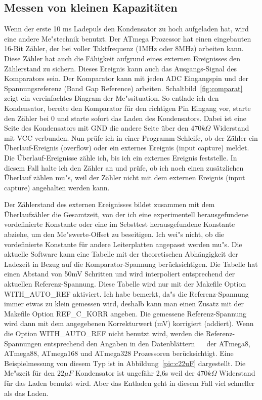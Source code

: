 \subsection{Messen von kleinen Kapazit\"aten}
Wenn der erste 10 ms Ladepuls den Kondensator zu hoch aufgeladen hat, wird eine andere Me"stechnik benutzt.
Der ATmega Prozessor hat einen eingebauten 16-Bit Z\"ahler, der bei voller Taktfrequenz (1MHz oder 8MHz) arbeiten kann.
Diese Z\"ahler hat auch die F\"ahigkeit aufgrund eines externen Ereignisses den Z\"ahlerstand zu sichern.
Dieses Ereignis kann auch das Ausgangs-Signal des Komparators sein.
Der Komparator kann mit jeden ADC Eingangspin und der Spannungsreferenz (Band Gap Reference) arbeiten.
Schaltbild~\ref{fig:comparat} zeigt ein vereinfachtes Diagram der Me"ssituation.
So entlade ich den Kondensator, bereite den Komparator f\"ur den richtigen Pin Eingang vor, starte den Z\"ahler bei 0 und
starte sofort das Laden des Kondensators.
Dabei ist eine Seite des Kondensators mit GND die andere Seite \"uber den \(470k\Omega\) Widerstand mit VCC verbunden.
Nun pr\"ufe ich in einer Programm-Schleife, ob der Z\"ahler ein \"Uberlauf-Ereignis (overflow) oder ein
 externes Ereignis (input capture) meldet.
Die \"Uberlauf-Ereignisse z\"ahle ich, bis ich ein externes Ereignis feststelle.
In diesem Fall halte ich den Z\"ahler an und pr\"ufe, ob ich noch einen zus\"atzlichen \"Uberlauf z\"ahlen mu"s, 
weil der Z\"ahler nicht mit dem externen Ereignis (input capture) angehalten werden kann.


Der Z\"ahlerstand des externen Ereignisses bildet zusammen mit dem \"Uberlaufz\"ahler die Gesamtzeit,
von der ich eine experimentell herausgefundene vordefinierte Konstante oder eine im Sebsttest herausgefundene Konstante abziehe, 
um den Me"swerte-Offset zu beseitigen.
Ich wei"s nicht, ob die vordefinierte Konstante f\"ur andere Leiterplatten angepasst werden mu"s.
Die aktuelle Software kann eine Tabelle mit der theoretischen Abh\"angigkeit der Ladezeit in Bezug auf die Komparator-Spannung ber\"ucksichtigen.
Die Tabelle hat einen Abstand von 50mV Schritten und wird interpoliert entsprechend der aktuellen Referenz-Spannung.
Diese Tabelle wird nur mit der Makefile Option WITH\_AUTO\_REF aktiviert.
Ich habe bemerkt, da"s die Referenz-Spannung immer etwas zu klein gemessen wird,
 deshalb kann man einen Zusatz mit der Makefile Option REF\_C\_KORR angeben.
Die gemessene Referenz-Spannung wird dann mit dem angegebenen Korrekturwert (mV) korrigiert (addiert).
Wenn die Option WITH\_AUTO\_REF nicht benutzt wird, werden die Referenz-Spannungen entsprechend den Angaben in den
Datenbl\"attern ~\cite{ATmega8}~\cite{ATmega168} der ATmega8, ATmega88, ATmega168 und ATmega328 Prozessoren ber\"ucksichtigt.
Eine Beispielmessung von diesem Typ ist in Abbildung~\ref{pic:c22uF} dargestellt.
Die Me"szeit f\"ur den \(22 \mu F\) Kondensator ist ungef\"ahr 2,6s weil der \(470k\Omega\) Widerstand f\"ur das Laden benutzt wird.
Aber das Entladen geht in diesem Fall viel schneller als das Laden.

